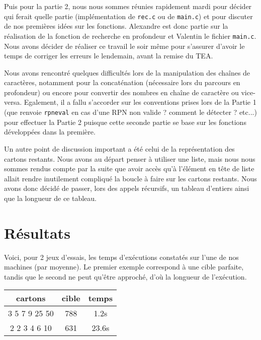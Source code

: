 \documentclass[11pt]{article}
\begin{document}
Puis pour la partie 2, nous nous sommes réunies rapidement mardi pour décider qui ferait quelle partie (implémentation de \texttt{rec.c} ou de \texttt{main.c}) et pour discuter de nos premières idées sur les fonctions. Alexandre est donc partie sur la réalisation de la fonction de recherche en profondeur et Valentin le fichier \texttt{main.c}. Nous avons décider de réaliser ce travail le soir même pour s’assurer d’avoir le temps de corriger les erreurs le lendemain, avant la remise du TEA.

Nous avons rencontré quelques difficultés lors de la manipulation des chaînes de caractères, notamment pour la concaténation (nécessaire lors du parcours en profondeur) ou encore pour convertir des nombres en chaîne de caractère ou vice-versa. Egalement, il a fallu s'accorder sur les conventions prises lors de la Partie 1 (que renvoie \texttt{rpn\textunderscore eval} en cas d'une RPN non valide ? comment le détecter ? etc...) pour effectuer la Partie 2 puisque cette seconde partie se base sur les fonctions développées dans la première.

Un autre point de discussion important a été celui de la représentation des cartons restants. Nous avons au départ penser à utiliser une liste, mais nous nous sommes rendus compte par la suite que avoir accès qu'à l'élément en tête de liste allait rendre inutilement compliqué la boucle à faire sur les cartons restants. Nous avons donc décidé de passer, lors des appels récursifs, un tableau d'entiers ainsi que la longueur de ce tableau.

\section{Résultats}

Voici, pour 2 jeux d'essais, les temps d'exécutions constatés sur l'une de nos machines (par moyenne).
Le premier exemple correspond à une cible parfaite, tandis que le second ne peut qu'être approché, d'où la longueur de l'exécution.

\begin{center}
\begin{tabular}{||c c c||} 
 \hline
 cartons & cible & temps \\ [0.5ex] 
 \hline\hline
 3 5 7 9 25 50 & 788 & 1.2s \\ 
 \hline
 2 2 3 4 6 10 & 631 & 23.6s \\ [1ex] 
\hline
\end{tabular}
\end{center}
\end{document}
